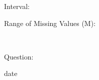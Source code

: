 \documentclass[
]{article}
\begin{document}
\begin{minipage}[t]{0.3\linewidth}

Interval:

\end{minipage}%
\begin{minipage}[t]{0.7\linewidth}

\end{minipage}

\begin{minipage}[t]{0.3\linewidth}

Range of Missing Values (M):

\end{minipage}%
\begin{minipage}[t]{0.7\linewidth}

~

\end{minipage}

\begin{minipage}[t]{0.3\linewidth}

Question:

\end{minipage}%
\begin{minipage}[t]{0.7\linewidth}

date

\end{minipage}
\end{document}
